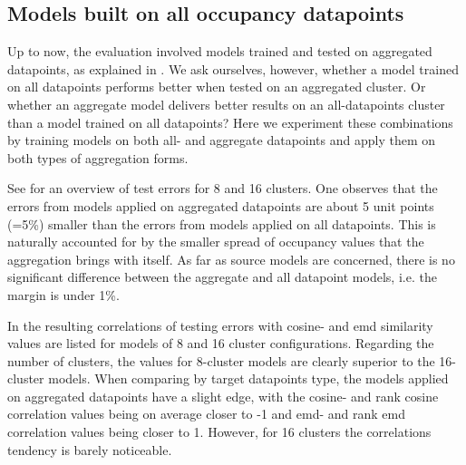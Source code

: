 


\subsection{Models built on all occupancy datapoints}
\label{evaluation:entire_datapoints}
Up to now, the evaluation involved models trained and tested on aggregated datapoints, as explained in . We ask ourselves, however, whether a model trained on all datapoints performs better when tested on an aggregated cluster. Or whether an aggregate model delivers better results on an all-datapoints cluster than a model trained on all datapoints? Here we experiment these combinations by training models on both all- and aggregate datapoints and apply them on both types of aggregation forms. 

See  for an overview of test errors for 8 and 16 clusters. One observes that the errors from models applied on aggregated datapoints are about 5 unit points (=5\%) smaller than the errors from models applied on all datapoints. This is naturally accounted for by the smaller spread of occupancy values that the aggregation brings with itself. As far as source models are concerned, there is no significant difference between the aggregate and all datapoint models, i.e. the margin is under 1\%.

In  the resulting correlations of testing errors with cosine- and emd similarity values are listed for models of 8 and 16 cluster configurations. Regarding the number of clusters, the values for 8-cluster models are clearly superior to the 16-cluster models. When comparing by target datapoints type, the models applied on aggregated datapoints have a slight edge, with the cosine- and rank cosine correlation values being on average closer to -1 and emd- and rank emd correlation values being closer to 1. However, for 16 clusters the correlations tendency is barely noticeable.
	
